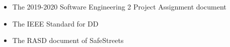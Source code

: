 \begin{itemize}
	
	\item The 2019-2020 Software Engineering 2 Project Assignment document
	\item The IEEE Standard for DD
	\item The RASD document of SafeStreets
	
\end{itemize}